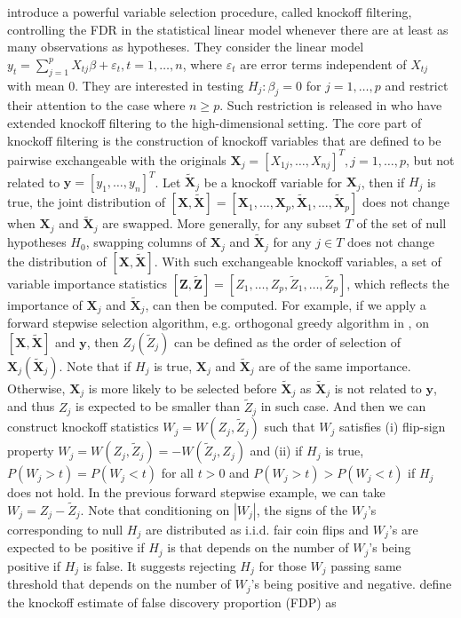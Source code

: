 \documentclass[]{interact}
\theoremstyle{plain}%
\theoremstyle{definition}
\theoremstyle{remark}
\begin{document}
\cite{barber2015controlling} introduce a powerful variable selection procedure, called knockoff filtering, controlling the FDR in the statistical linear model whenever there are at least as many observations as hypotheses. They consider the linear model $y_t = \sum_{j=1}^p X_{tj} \beta + \varepsilon_t, t=1,\ldots,n$, where $\varepsilon_t$ are error terms independent of $X_{tj}$ with mean $0$. They are interested in testing $H_j: \beta_j=0$ for $j=1,\ldots, p$ and restrict their attention to the case where $n \ge p$. Such restriction is released in \cite{barber2019knockoff} who have extended knockoff filtering to the high-dimensional setting. The core part of knockoff filtering is the construction of knockoff variables that are defined to be pairwise exchangeable with the originals $\bm X_j = [X_{1j}, \ldots, X_{nj}]^T, j = 1, \ldots, p$, but not related to $\bm y = [y_1, \ldots, y_n]^T$. Let $\bm{\tilde X}_j$ be a knockoff variable for $\bm X_j$, then if $H_j$ is true, the joint distribution of $[\bm X, \bm{\tilde X}] = [\bm X_1, \ldots, \bm X_p, \bm{\tilde X}_1, \ldots, \bm{\tilde X}_p]$ does not change when $\bm X_j$ and $\bm{\tilde X}_j$ are swapped. More generally, for any subset $T$ of the set of null hypotheses $H_0$, swapping columns of $\bm X_j$ and $\bm{\tilde X}_j$ for any $j \in T$ does not change the distribution of $[\bm X, \bm{\tilde X}]$. With such exchangeable knockoff variables, a set of variable importance statistics $[\bm Z, \bm{\tilde Z}] = [Z_1, \ldots, Z_p, \tilde Z_1, \ldots, \tilde Z_p]$, which reflects the importance of $\bm X_j$ and $\bm{\tilde X}_j$, can then be computed. For example, if we apply a forward stepwise selection algorithm, e.g. orthogonal greedy algorithm in \cite{ing2017multiple}, on $[\bm X, \bm{\tilde X}]$ and $\bm y$, then $Z_j (\tilde Z_j)$ can be defined as the order of selection of $\bm X_j (\bm{\tilde X}_j)$. Note that if $H_j$ is true, $\bm X_j$ and $\bm{\tilde X}_j$ are of the same importance. Otherwise, $\bm X_j$ is more likely to be selected before $\bm{\tilde X}_j$ as $\bm{\tilde X}_j$ is not related to $\bm y$, and thus $Z_j$ is expected to be smaller than $\tilde Z_j$ in such case. And then we can construct knockoff statistics $W_j = W(Z_j, \tilde Z_j)$ such that $W_j$ satisfies (i) flip-sign property $W_j = W(Z_j, \tilde Z_j) = -W(\tilde Z_j, Z_j)$ and (ii) if $H_j$ is true, $P(W_j > t) = P(W_j < t)$ for all $t>0$ and $P(W_j > t) > P(W_j < t)$ if $H_j$ does not hold. In the previous forward stepwise example, we can take $W_j = Z_j - \tilde Z_j $. Note that conditioning on $|W_j|$, the signs of the $W_j$'s corresponding to null $H_j$ are distributed as i.i.d. fair coin flips and $W_j$'s are expected to be positive if $H_j$ is that depends on the number of $W_j$'s being positive if $H_j$ is false. It suggests rejecting $H_j$ for those $W_j$ passing same threshold that depends on the number of $W_j$'s being positive and negative. \cite{barber2015controlling} define the knockoff estimate of false discovery proportion (FDP) as
\end{document}
